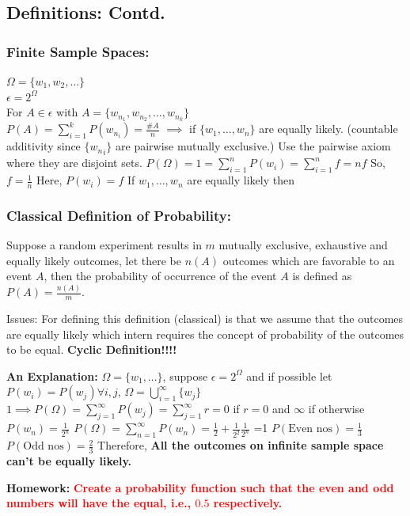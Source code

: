\documentclass{article}
\theoremstyle{definition}
\begin{document}
\subsection{Definitions: {Contd.}}
\subsubsection{Finite Sample Spaces:}
    $\Omega = \{w_1, w_2, \dots\}$\\
    $\epsilon = 2^{\Omega}$\\
    For $A \in \epsilon$ with $A = \{w_{n_1}, w_{n_2}, \dots, w_{n_k}\}$\\
    $P(A) = \sum_{i=1}^{k} P(w_{n_i}) = \frac{\#A}{n}$ $\implies$ if $\{w_1, \dots , w_n\}$ are equally likely. 
    (countable additivity since $\{{w_n}_i\}$ are pairwise mutually exclusive.)
    Use the pairwise axiom where they are disjoint sets.
    $P(\Omega) = 1 = \sum_{i=1}^{n} P(w_i) = \sum_{i=1}^{n} f = nf$
    So, $f= \frac{1}{n}$
    Here, $P(w_i) = f$
    If $w_1, \dots , w_n$ are equally likely then
\subsubsection{Classical Definition of Probability:} 
Suppose a random experiment results in $m$ mutually exclusive, exhaustive and equally likely outcomes, let there be $n(A)$ outcomes which are favorable to an event $A$, then the probability of occurrence of the event $A$ is defined as $P(A) = \frac{n(A)}{m}$.

    Issues: For defining this definition (classical) is that we assume that the outcomes are equally likely which intern requires the concept of probability of the outcomes to be equal.
    \textbf{Cyclic Definition!!!!}

    \textbf{An Explanation:}
    $\Omega = \{w_1, \dots\}$, suppose $ \epsilon = 2^\Omega $ and if possible let $P(w_i) = P(w_j) \forall i, j$,
    $\Omega = \bigcup_{i=1}^{\infty} \{w_j\} $
    $1 \implies P(\Omega) = \sum_{j=1}^{\infty}P(w_j) = \sum_{j=1}^{\infty} r = 0$ if $r=0$ and $\infty$ if otherwise
    $P(w_n)= \frac{1}{2^n}$
    $P(\Omega) = \sum_{n=1}^{\infty} P(w_n) = \frac{1}{2} + \frac{1}{2^2} \frac{1}{2^n}$
    =1
    $P(\text{Even nos}) = \frac{1}{3}$
    $P(\text{Odd nos}) = \frac{2}{3}$
    Therefore, \textbf{All the outcomes on infinite sample space can't be equally likely.}
\begin{mdframed}[style = HW]
    \textbf{Homework:} \textcolor{red}{\textbf{Create a probability function such that the even and odd numbers will have the equal, i.e., $0.5$ respectively.}}
\end{mdframed}
\end{document}
